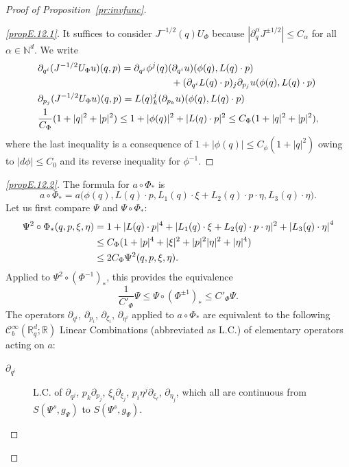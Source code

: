 \documentclass[10pt]{amsart}
\theoremstyle{definition}\newtheorem{defi}[theo]{Definition}\newtheorem{rema}[theo]{Remark}\newtheorem{exam}[theo]{Example}\newtheorem{exem}[theo]{Example}\newtheorem{nota}[theo]{Notation}
\newcommand{\R}{\mathbb{R}}
\newcommand{\N}{\mathbb{N}}
\newcommand{\clC}{\mathcal{C}}
\let\originalleft\left
\let\originalright\right
\renewcommand{\left}{\mathopen{}\mathclose\bgroup\originalleft}
\renewcommand{\right}{\aftergroup\egroup\originalright}
\newenvironment{proofc}[1][\proofname]{\begin{proof}[#1]}{\end{proof}}
\begin{document}
\begin{proofc}[{Proof of Proposition~\ref{pr:invfunc}}]
\begin{proof}[{\eqref{propE.12.1}}] 
It suffices to consider $J^{-1/2}(q)U_{\Phi}$ because $|\partial_{q}^{\alpha}J^{\pm 1/2}|\leq C_{\alpha}$ for all $\alpha\in \N^{d}$. We write
\begin{align*}
&
\partial_{q^{i}}(J^{-1/2}U_{\Phi}u)(q,p)=\partial_{q^{i}}\phi^{j}(q)(\partial_{q^{i}}u)(\phi(q),L(q)\cdot p)
\\ &\mkern250mu +(\partial_{q^{i}}L(q)\cdot p)_{j}\partial_{p_{j}}u(\phi(q),L(q)\cdot p)
\\
&
\partial_{p_{j}}(J^{-1/2}U_{\Phi}u)(q,p)=L(q)^{j}_{k}(\partial_{p_{k}}u)(\phi(q),L(q)\cdot p)\\
&\frac{1}{C_{\Phi}}(1+|q|^{2}+|p|^{2})\leq 1+|\phi(q)|^{2}+|L(q)\cdot p|^{2}\leq C_{\Phi}(1+|q|^{2}+|p|^{2}),
\end{align*}
where the last inequality is a consequence of $1+|\phi(q)|\leq C_{\phi}(1+|q|^{2})$ owing to $|d\phi|\leq C_{0}$ and its reverse inequality for $\phi^{-1}$.
\let\qed\relax
\end{proof}
\begin{proof}[{\eqref{propE.12.2}}]
The formula for $a\circ \Phi_{*}$ is
\[
a\circ\Phi_{*}=a\bigl(\phi(q),L(q)\cdot p, L_{1}(q)\cdot\xi+L_{2}(q)\cdot p\cdot\eta,L_{3}(q)\cdot \eta\bigr).
\]
Let us first compare $\Psi$ and $\Psi\circ \Phi_{*}$:
\begin{align*}
\Psi^{2}\circ \Phi_{*}(q,p,\xi,\eta)&=1+|L(q)\cdot p|^{4}+|L_{1}(q)\cdot \xi+L_{2}(q)\cdot p\cdot \eta|^{2} +\left|L_{3}(q)\cdot\eta\right|^{4}
\\
&\leq C_{\Phi}(1+|p|^{4}+|\xi|^{2}+|p|^{2}|\eta|^{2}+|\eta|^{4})\\
&\leq 2C_{\Phi}\Psi^{2}(q,p,\xi,\eta).
\end{align*}
Applied to $\Psi^{2}\circ(\Phi^{-1})_{*}$, this provides the equivalence
\[
\frac{1}{C'_{\Phi}}\Psi\leq \Psi\circ (\Phi^{\pm 1})_{*}\leq C'_{\Phi}\Psi.
\]
The operators $\partial_{q^{i}}$,  $\partial_{p_{i}}$, $\partial_{\xi_{i}}$, $\partial_{\eta^{i}}$ applied to $a\circ \Phi_{*}$ are equivalent to the following $\clC^{\infty}_{b}(\R_{q}^{d};\R)$ Linear Combinations (abbreviated as L.C.) of elementary operators acting on $a$:
\begin{description}
\item[$\partial_{q^{i}}$] L.C. of $\partial_{q^{j}}$, $p_{k}\partial_{p_{j}}$, $\xi_i\partial_{\xi_{j}}$, $p_{i}\eta^{j}\partial_{\xi_{\ell}}$, $\partial_{\eta_{j}}$, which all are continuous from $S(\Psi^{s},g_{\Psi})$ to $S(\Psi^{s},g_{\Psi})$.

\end{description}
\end{proof}
\end{proofc}
\end{document}
